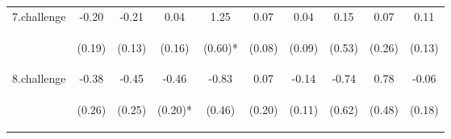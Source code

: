 \begin{center}
\begin{tabular}{lccccccccc}
\noalign{\smallskip}7.challenge & -0.20 & -0.21 & 0.04 & 1.25 & 0.07 & 0.04 & 0.15 & 0.07 & 0.11\\
 & \begin{footnotesize}(0.19)\end{footnotesize} & \begin{footnotesize}(0.13)\end{footnotesize} & \begin{footnotesize}(0.16)\end{footnotesize} & \begin{footnotesize}(0.60)*\end{footnotesize} & \begin{footnotesize}(0.08)\end{footnotesize} & \begin{footnotesize}(0.09)\end{footnotesize} & \begin{footnotesize}(0.53)\end{footnotesize} & \begin{footnotesize}(0.26)\end{footnotesize} & \begin{footnotesize}(0.13)\end{footnotesize}\\
\noalign{\smallskip}8.challenge & -0.38 & -0.45 & -0.46 & -0.83 & 0.07 & -0.14 & -0.74 & 0.78 & -0.06\\
 & \begin{footnotesize}(0.26)\end{footnotesize} & \begin{footnotesize}(0.25)\end{footnotesize} & \begin{footnotesize}(0.20)*\end{footnotesize} & \begin{footnotesize}(0.46)\end{footnotesize} & \begin{footnotesize}(0.20)\end{footnotesize} & \begin{footnotesize}(0.11)\end{footnotesize} & \begin{footnotesize}(0.62)\end{footnotesize} & \begin{footnotesize}(0.48)\end{footnotesize} & \begin{footnotesize}(0.18)\end{footnotesize}\\

\end{tabular}
\end{center}
